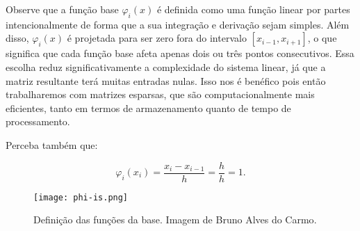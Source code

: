 Observe que a função base $\varphi_i(x)$ é definida como uma função linear por partes intencionalmente de forma que a sua integração e derivação sejam simples. Além disso, $\varphi_i(x)$ é projetada para ser zero fora do intervalo $[x_{i-1},x_{i+1}]$, o que significa que cada função base afeta apenas dois ou três pontos consecutivos. Essa escolha reduz significativamente a complexidade do sistema linear, já que a matriz resultante terá muitas entradas nulas. Isso nos é benéfico pois então trabalharemos com matrizes esparsas, que são computacionalmente mais eficientes, tanto em termos de armazenamento quanto de tempo de processamento.

Perceba também que:

\[\varphi_i(x_i) = \dfrac{x_i - x_{i-1}}{h} = \dfrac{h}{h} = 1.\]

\begin{figure}[H]
  \centering
  \texttt{[image: phi-is.png]}
  \caption{Definição das funções da base. Imagem de Bruno Alves do Carmo\cite{Bacarmo}.}
\end{figure}


